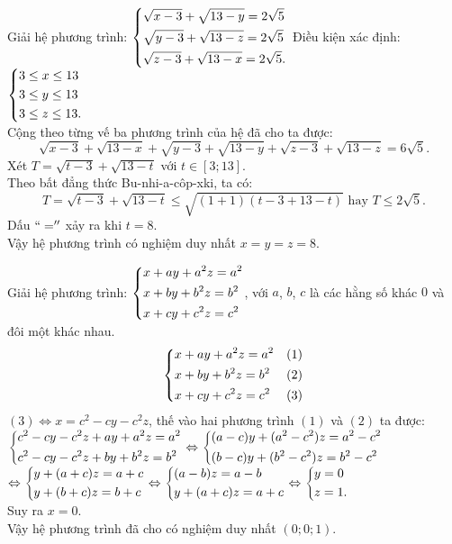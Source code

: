 \begin{ex}%
 Giải hệ phương trình: $\left\{\begin{aligned}& \sqrt{x-3} + \sqrt{13-y} = 2\sqrt{5} \\& \sqrt{y-3} + \sqrt{13-z} = 2\sqrt{5} \\& \sqrt{z-3} + \sqrt{13-x} = 2\sqrt{5}.\end{aligned}\right.$
 \loigiai
  {
  Điều kiện xác định: $\left\{\begin{aligned}& 3 \leq x \leq 13 \\& 3 \leq y \leq 13 \\& 3 \leq z \leq 13.\end{aligned}\right.$\\
  Cộng theo từng vế ba phương trình của hệ đã cho ta được:
  $$\sqrt{x-3} + \sqrt{13-x} + \sqrt{y-3} + \sqrt{13-y} + \sqrt{z-3} + \sqrt{13-z} = 6\sqrt{5}.$$
  Xét $T = \sqrt{t-3} + \sqrt{13-t}$ với $t \in [3;13]$.\\
  Theo bất đẳng thức Bu-nhi-a-côp-xki, ta có:
  $$T = \sqrt{t-3} + \sqrt{13-t} \leq \sqrt{(1+1)(t-3+13-t)} \text{ hay } T \leq 2\sqrt{5}.$$
  Dấu $``=''$ xảy ra khi $t = 8$.\\
  Vậy hệ phương trình có nghiệm duy nhất $x = y = z = 8$.
  }
\end{ex}


\begin{ex}%
 Giải hệ phương trình: $\left\{\begin{aligned}& x+ay+a^2z=a^2 \\& x+by+b^2z=b^2 \\& x+cy+c^2z=c^2\end{aligned}\right.$, với $a$, $b$, $c$ là các hằng số khác $0$ và đôi một khác nhau.
 \loigiai
  {
  $$\left\{\begin{aligned}& x+ay+a^2z=a^2 & (1) \\& x+by+b^2z=b^2 & (2) \\& x+cy+c^2z=c^2 & (3)\end{aligned}\right.$$
  $(3) \Leftrightarrow x = c^2 - cy - c^2z$, thế vào hai phương trình $(1)$ và $(2)$ ta được:\\
  \hspace*{0.5cm}$\left\{\begin{aligned}& c^2 - cy - c^2z + ay + a^2z = a^2 \\& c^2 - cy - c^2z + by + b^2z = b^2\end{aligned}\right. \Leftrightarrow \left\{\begin{aligned}& (a-c)y + (a^2-c^2)z = a^2-c^2 \\& (b-c)y + (b^2-c^2)z = b^2-c^2\end{aligned}\right.$\\
  $\Leftrightarrow \left\{\begin{aligned}& y + (a+c)z = a+c \\& y + (b+c)z = b+c\end{aligned}\right. \Leftrightarrow \left\{\begin{aligned}& (a-b)z = a-b \\& y + (a+c)z = a+c\end{aligned}\right. \Leftrightarrow \left\{\begin{aligned}& y = 0 \\& z = 1.\end{aligned}\right.$\\
  Suy ra $x = 0$.\\
  Vậy hệ phương trình đã cho có nghiệm duy nhất $(0;0;1)$.
  }
\end{ex}


